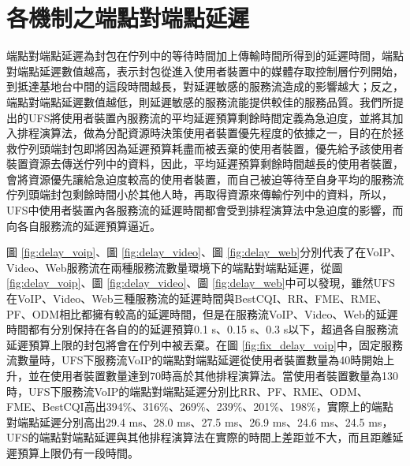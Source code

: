 \section{各機制之端點對端點延遲}
端點對端點延遲為封包在佇列中的等待時間加上傳輸時間所得到的延遲時間，端點對端點延遲數值越高，表示封包從進入使用者裝置中的媒體存取控制層佇列開始，到抵達基地台中間的這段時間越長，對延遲敏感的服務流造成的影響越大；反之，端點對端點延遲數值越低，則延遲敏感的服務流能提供較佳的服務品質。我們所提出的UFS將使用者裝置內服務流的平均延遲預算剩餘時間定義為急迫度，並將其加入排程演算法，做為分配資源時決策使用者裝置優先程度的依據之一，目的在於拯救佇列頭端封包即將因為延遲預算耗盡而被丟棄的使用者裝置，優先給予該使用者裝置資源去傳送佇列中的資料，因此，平均延遲預算剩餘時間越長的使用者裝置，會將資源優先讓給急迫度較高的使用者裝置，而自己被迫等待至自身平均的服務流佇列頭端封包剩餘時間小於其他人時，再取得資源來傳輸佇列中的資料，所以，UFS中使用者裝置內各服務流的延遲時間都會受到排程演算法中急迫度的影響，而向各自服務流的延遲預算逼近。

圖 \ref{fig:delay_voip}、圖 \ref{fig:delay_video}、圖 \ref{fig:delay_web}分別代表了在VoIP、Video、Web服務流在兩種服務流數量環境下的端點對端點延遲，從圖 \ref{fig:delay_voip}、圖 \ref{fig:delay_video}、圖 \ref{fig:delay_web}中可以發現，雖然UFS在VoIP、Video、Web三種服務流的延遲時間與BestCQI\cite{su2016}、RR\cite{arsh2015}、FME\cite{fmerme2008}、RME\cite{safa2012}、PF\cite{kush2002}、ODM\cite{kana2015}相比都擁有較高的延遲時間，但是在服務流VoIP、Video、Web的延遲時間都有分別保持在各自的的延遲預算0.1 s、0.15 s、0.3 s以下，超過各自服務流延遲預算上限的封包將會在佇列中被丟棄。在圖 \ref{fig:fix_delay_voip}中，固定服務流數量時，UFS下服務流VoIP的端點對端點延遲從使用者裝置數量為40時開始上升，並在使用者裝置數量達到70時高於其他排程演算法。當使用者裝置數量為130時，UFS下服務流VoIP的端點對端點延遲分別比RR、PF、RME、ODM、FME、BestCQI高出394\%、316\%、269\%、239\%、201\%、198\%，實際上的端點對端點延遲分別高出29.4 ms、28.0 ms、27.5 ms、26.9 ms、24.6 ms、24.5 ms，UFS的端點對端點延遲與其他排程演算法在實際的時間上差距並不大，而且距離延遲預算上限仍有一段時間。

